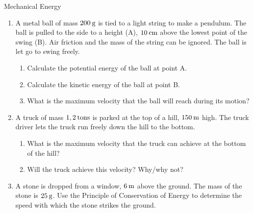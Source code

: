 \begin{eocexercises}{Mechanical Energy}
\begin{enumerate}[noitemsep, label=\textbf{\arabic*}. ]
\label{m38786*id71971}\begin{enumerate}[noitemsep, label=\textbf{\alph*}. ] 
            \label{m38786*uid133}\item What is the maximum height that the rock will reach?
\label{m38786*uid134}\item Draw graphs to show how the potential energy, kinetic energy and mechanical energy of the rock changes as it moves to its highest point.
\end{enumerate}
                  \label{m38786*uid135}\item A metal ball of mass $200\phantom{\rule{2pt}{0ex}}\text{g}$ is tied to a light string to make a pendulum. The ball is pulled to the side to a height (A), $10\phantom{\rule{2pt}{0ex}}\text{cm}$ above the lowest point of the swing (B). Air friction and the mass of the string can be ignored. The ball is let go to swing freely.
\label{m38786*id72026}\begin{enumerate}[noitemsep, label=\textbf{\alph*}. ] 
            \label{m38786*uid136}\item Calculate the potential energy of the ball at point A.
\label{m38786*uid137}\item Calculate the kinetic energy of the ball at point B.
\label{m38786*uid138}\item What is the maximum velocity that the ball will reach during its motion?
\end{enumerate}
                \label{m38786*uid139}\item A truck of mass $1,2\phantom{\rule{2pt}{0ex}}\text{tons}$ is parked at the top of a hill, $150\phantom{\rule{2pt}{0ex}}\text{m}$ high. The truck driver lets the truck run freely down the hill to the bottom.
\label{m38786*id72082}\begin{enumerate}[noitemsep, label=\textbf{\alph*}. ] 
            \label{m38786*uid140}\item What is the maximum velocity that the truck can achieve at the bottom of the hill?
\label{m38786*uid141}\item Will the truck achieve this velocity? Why/why not?
\end{enumerate}
                \label{m38786*uid142}\item A stone is dropped from a window, $6\phantom{\rule{2pt}{0ex}}\text{m}$ above the ground. The mass of the stone is $25\phantom{\rule{2pt}{0ex}}\text{g}$.
Use the Principle of Conservation of Energy to determine the speed with which the stone strikes the ground.
           \end{enumerate}

\end{eocexercises}
